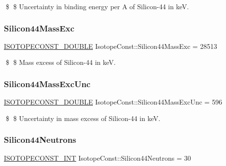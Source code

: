 \$ \$ Uncertainty in binding energy per A of Silicon-\/44 in keV. \mbox{\label{group___isotope_const-_silicon-_si44_gaf9f538e549997629aaeb79da7516fa40}} 
\subsubsection{\texorpdfstring{Silicon44\+Mass\+Exc}{Silicon44MassExc}}
{\footnotesize\ttfamily \mbox{\hyperlink{group___isotope_const-_macros_ga8f45a7272ce02c0b4c65c44636ed719a}{I\+S\+O\+T\+O\+P\+E\+C\+O\+N\+S\+T\+\_\+\+D\+O\+U\+B\+LE}} Isotope\+Const\+::\+Silicon44\+Mass\+Exc = 28513}

\$ \$ Mass excess of Silicon-\/44 in keV. \mbox{\label{group___isotope_const-_silicon-_si44_ga93516c33d6f58925e8180fd77edccf4e}} 
\subsubsection{\texorpdfstring{Silicon44\+Mass\+Exc\+Unc}{Silicon44MassExcUnc}}
{\footnotesize\ttfamily \mbox{\hyperlink{group___isotope_const-_macros_ga8f45a7272ce02c0b4c65c44636ed719a}{I\+S\+O\+T\+O\+P\+E\+C\+O\+N\+S\+T\+\_\+\+D\+O\+U\+B\+LE}} Isotope\+Const\+::\+Silicon44\+Mass\+Exc\+Unc = 596}

\$ \$ Uncertainty in mass excess of Silicon-\/44 in keV. \mbox{\label{group___isotope_const-_silicon-_si44_gabe008198b76447aecf64934919436519}} 
\subsubsection{\texorpdfstring{Silicon44\+Neutrons}{Silicon44Neutrons}}
{\footnotesize\ttfamily \mbox{\hyperlink{group___isotope_const-_macros_ga5f18360b3e99483a35c32d789e62621c}{I\+S\+O\+T\+O\+P\+E\+C\+O\+N\+S\+T\+\_\+\+I\+NT}} Isotope\+Const\+::\+Silicon44\+Neutrons = 30}

